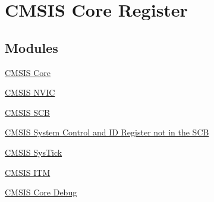 \hypertarget{group___c_m_s_i_s__core__register}{\section{C\-M\-S\-I\-S Core Register}
\label{group___c_m_s_i_s__core__register}
}
\subsection*{Modules}
\begin{DoxyCompactItemize}
\item 
\hyperlink{group___c_m_s_i_s___c_o_r_e}{C\-M\-S\-I\-S Core}
\item 
\hyperlink{group___c_m_s_i_s___n_v_i_c}{C\-M\-S\-I\-S N\-V\-I\-C}
\item 
\hyperlink{group___c_m_s_i_s___s_c_b}{C\-M\-S\-I\-S S\-C\-B}
\item 
\hyperlink{group___c_m_s_i_s___s_cn_s_c_b}{C\-M\-S\-I\-S System Control and I\-D Register not in the S\-C\-B}
\item 
\hyperlink{group___c_m_s_i_s___sys_tick}{C\-M\-S\-I\-S Sys\-Tick}
\item 
\hyperlink{group___c_m_s_i_s___i_t_m}{C\-M\-S\-I\-S I\-T\-M}
\item 
\hyperlink{group___c_m_s_i_s___core_debug}{C\-M\-S\-I\-S Core Debug}
\end{DoxyCompactItemize}
